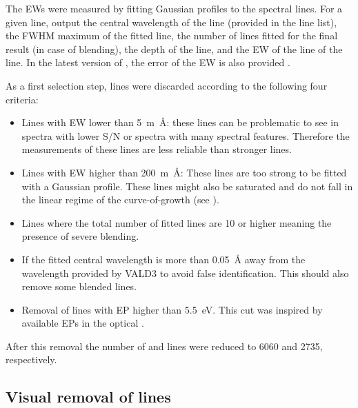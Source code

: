 The EWs were measured by fitting Gaussian profiles to the spectral lines. For a given line,
 output the central wavelength of the line (provided in the line list), the FWHM maximum
of the fitted line, the number of lines fitted for the final result (in case of blending), the depth
of the line, and the EW of the line of the line. In the latest version of , the error of
the EW is also provided \citep{Sousa2015a}.

As a first selection step, lines were discarded according to the following four criteria:

\begin{itemize}
  \item Lines with EW lower than \SI{5}{m\angstrom}: these lines can be problematic to see in
        spectra with lower S/N or spectra with many spectral features. Therefore the measurements
        of these lines are less reliable than stronger lines.
  \item Lines with EW higher than \SI{200}{m\angstrom}: These lines are too strong to be fitted
        with a Gaussian profile. These lines might also be saturated and do not fall in the linear
        regime of the curve-of-growth (see ).
  \item Lines where the total number of fitted lines are 10 or higher meaning the presence of
        severe blending.
  \item If the fitted central wavelength is more than \SI{0.05}{\angstrom} away from the wavelength
        provided by VALD3 to avoid false identification. This should also remove some blended lines.
  \item Removal of lines with EP higher than \SI{5.5}{eV}. This cut was inspired by available EPs in
        the optical \citep[see e.g.][]{Sousa2008a}.
\end{itemize}
After this removal the number of  and  lines were reduced to \num{6060} and
\num{2735}, respectively.


\subsection{Visual removal of lines}
\label{sec:visual}

